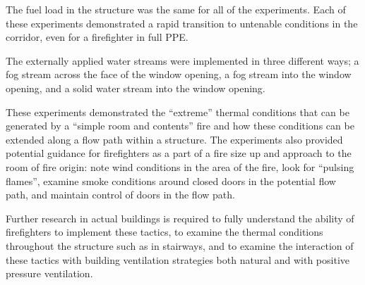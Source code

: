 \documentclass[12pt,oneside]{book}
\begin{document}
The fuel load in the structure was the same for all of the experiments. Each of these experiments
demonstrated a rapid transition to untenable conditions in the corridor, even for a firefighter in full PPE.



The externally applied water streams were implemented in three different ways; a fog stream across the face
of the window opening, a fog stream into the window opening, and a solid water stream into the window
opening. 

These experiments demonstrated the “extreme” thermal conditions that can be generated by a “simple
room and contents” fire and how these conditions can be extended along a flow path within a structure.
The experiments also provided potential guidance for firefighters as a part of a fire size up and approach
to the room of fire origin: note wind conditions in the area of the fire, look for “pulsing flames”,
examine smoke conditions around closed doors in the potential flow path, and maintain control of doors
in the flow path.

Further research in actual buildings is required to fully understand the ability of firefighters to
implement these tactics, to examine the thermal conditions throughout the structure such as in stairways,
and to examine the interaction of these tactics with building ventilation strategies both natural and with
positive pressure ventilation.






\end{document}
